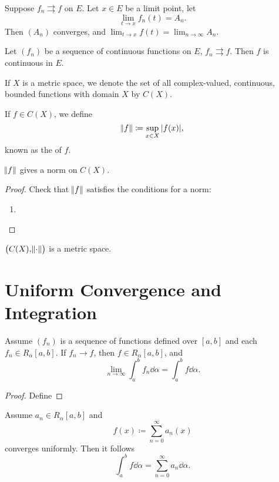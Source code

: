 \begin{proposition}
Suppose $f_n\rightrightarrows f$ on $E$. Let $x\in E$ be a limit point, let
\[\lim_{t\to x}f_n(t)=A_n.\]
Then $(A_n)$ converges, and $\displaystyle\lim_{t\to x}f(t)=\lim_{n\to\infty}A_n$.
\end{proposition}

\begin{proposition}
Let $(f_n)$ be a sequence of continuous functions on $E$, $f_n\rightrightarrows f$. Then $f$ is continuous in $E$.
\end{proposition}

\begin{definition}
If $X$ is a metric space, we denote the set of all complex-valued, continuous, bounded functions with domain $X$ by $C(X)$.

If $f\in C(X)$, we define 
\[\norm{f}\coloneqq\sup_{x\in X}|f(x)|,\]
known as the  of $f$.
\end{definition}

\begin{lemma}
$\norm{f}$ gives a norm on $C(X)$.
\end{lemma}

\begin{proof}
Check that $\norm{f}$ satisfies the conditions for a norm:
\begin{enumerate}[label=(\roman*)]
\item 
\end{enumerate}
\end{proof}

\begin{proposition}
$\left(C(X),\norm{\cdot}\right)$ is a metric space.
\end{proposition}

\section{Uniform Convergence and Integration}
\begin{theorem}
Assume $(f_n)$ is a sequence of functions defined over $[a,b]$ and each $f_n\in R_\alpha[a,b]$. If $f_n\to f$, then $f\in R_\alpha[a,b]$, and
\[ \lim_{n\to\infty}\int_a^bf_n\dd{\alpha}=\int_a^bf\dd{\alpha}. \]
\end{theorem}

\begin{proof}
Define
\end{proof}

\begin{corollary}
Assume $a_n\in R_\alpha[a,b]$ and
\[ f(x)\coloneqq\sum_{n=0}^\infty a_n(x) \]
converges uniformly. Then it follows
\[ \int_a^bf\dd{\alpha}=\sum_{n=0}^\infty a_n\dd{\alpha}. \]
\end{corollary}

